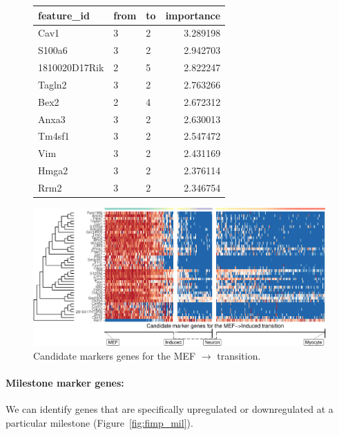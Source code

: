 \begin{figure}
{\footnotesize
\begin{tabular}{lllr}
\toprule
feature\_id & from & to & importance\\
\midrule
Cav1 & 3 & 2 & 3.289198\\
S100a6 & 3 & 2 & 2.942703\\
1810020D17Rik & 2 & 5 & 2.822247\\
Tagln2 & 3 & 2 & 2.763266\\
Bex2 & 2 & 4 & 2.672312\\
\addlinespace
Anxa3 & 3 & 2 & 2.630013\\
Tm4sf1 & 3 & 2 & 2.547472\\
Vim & 3 & 2 & 2.431169\\
Hmga2 & 3 & 2 & 2.376114\\
Rrm2 & 3 & 2 & 2.346754\\
\bottomrule
\end{tabular}
}
\includegraphics[width=.6\linewidth,valign=m]{manuscript_files/figure-latex/branchheatmap-1.pdf}
\caption{Candidate markers genes for the MEF $\rightarrow$ transition.}
\label{fig:fimp_tran}
\end{figure}

\paragraph{Milestone marker genes:}
We can identify genes that are specifically upregulated or downregulated
at a particular milestone (Figure~\ref{fig:fimp_mil}).

